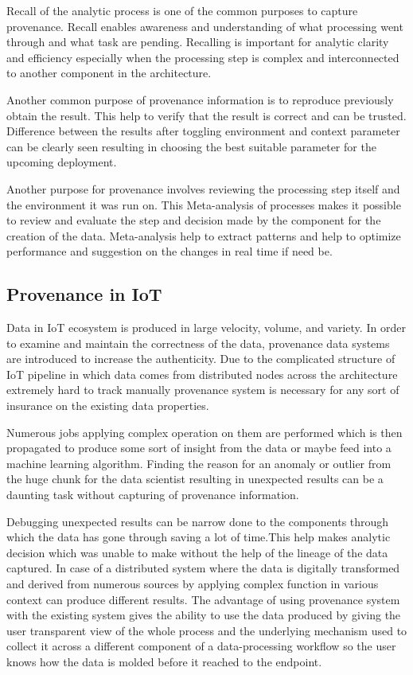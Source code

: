 Recall of the analytic process is one of the common purposes to capture provenance. Recall enables awareness and understanding of what processing went through and what task are pending. Recalling is important for analytic clarity and efficiency especially when the processing step is complex and interconnected to another component in the architecture. 

Another common purpose of provenance information is to reproduce previously obtain the result. This help to verify that the result is correct and can be trusted. Difference between the results after toggling environment and context parameter can be clearly seen resulting in choosing the best suitable parameter for the upcoming deployment.

Another purpose for provenance involves reviewing the processing step itself and the environment it was run on. This Meta-analysis of processes makes it possible to review and evaluate the step and decision made by the component for the creation of the data. Meta-analysis help to extract patterns and help to optimize performance and suggestion on the changes in real time if need be.

\subsection{Provenance in IoT}
Data in IoT ecosystem is produced in large velocity, volume, and variety. In order to examine and maintain the correctness of the data, provenance data systems are introduced to increase the authenticity. Due to the complicated structure of IoT pipeline in which data comes from distributed nodes across the architecture extremely hard to track manually provenance system is necessary for any sort of insurance on the existing data properties.

Numerous jobs applying complex operation on them are performed which is then propagated to produce some sort of insight from the data or maybe feed into a machine learning algorithm. Finding the reason for an anomaly or outlier from the huge chunk for the data scientist resulting in unexpected results can be a daunting task without capturing of provenance information. 

Debugging unexpected results can be narrow done to the components through which the data has gone through saving a lot of time.This help makes analytic decision which was unable to make without the help of the lineage of the data captured. In case of a distributed system where the data is digitally transformed and derived from numerous sources by applying complex function in various context can produce different results. The advantage of using provenance system with the existing system gives the ability to use the data produced by giving the user transparent view of the whole process and the underlying mechanism used to collect it across a different component of a data-processing workflow so the user knows how the data is molded before it reached to the endpoint.

